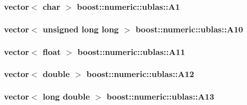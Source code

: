 \subsubsection[{\texorpdfstring{A1}{A1}}]{\setlength{\rightskip}{0pt plus 5cm}vector$<$ char $>$ boost\+::numeric\+::ublas\+::\+A1}\hypertarget{namespaceboost_1_1numeric_1_1ublas_adecfd0f3cb516b97b0da1565629f59d1}{}\label{namespaceboost_1_1numeric_1_1ublas_adecfd0f3cb516b97b0da1565629f59d1}
\subsubsection[{\texorpdfstring{A10}{A10}}]{\setlength{\rightskip}{0pt plus 5cm}vector$<$ unsigned long long $>$ boost\+::numeric\+::ublas\+::\+A10}\hypertarget{namespaceboost_1_1numeric_1_1ublas_a916d52ec29025a9ccb0f0436ffb4a5cd}{}\label{namespaceboost_1_1numeric_1_1ublas_a916d52ec29025a9ccb0f0436ffb4a5cd}
\subsubsection[{\texorpdfstring{A11}{A11}}]{\setlength{\rightskip}{0pt plus 5cm}vector$<$ float $>$ boost\+::numeric\+::ublas\+::\+A11}\hypertarget{namespaceboost_1_1numeric_1_1ublas_a1c64070e76144ca640278cb67b5a6d37}{}\label{namespaceboost_1_1numeric_1_1ublas_a1c64070e76144ca640278cb67b5a6d37}
\subsubsection[{\texorpdfstring{A12}{A12}}]{\setlength{\rightskip}{0pt plus 5cm}vector$<$ double $>$ boost\+::numeric\+::ublas\+::\+A12}\hypertarget{namespaceboost_1_1numeric_1_1ublas_a588ba2742f8ab5a89778c14813a9c148}{}\label{namespaceboost_1_1numeric_1_1ublas_a588ba2742f8ab5a89778c14813a9c148}
\subsubsection[{\texorpdfstring{A13}{A13}}]{\setlength{\rightskip}{0pt plus 5cm}vector$<$ long double $>$ boost\+::numeric\+::ublas\+::\+A13}\hypertarget{namespaceboost_1_1numeric_1_1ublas_a51d18fd225441f779d79ce1594ea3742}{}\label{namespaceboost_1_1numeric_1_1ublas_a51d18fd225441f779d79ce1594ea3742}
